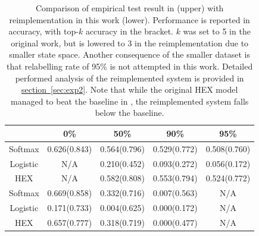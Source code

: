 \documentclass[11pt,a4paper]{article}
\begin{document}
\begin{table}[htbp]
\centering
\begin{tabular}{c|c|c|c|c}
 & 0\% & 50\% & 90\% & 95\%\\
\hline
Softmax & 0.626(0.843) & 0.564(0.796) & 0.529(0.772) & 0.508(0.760)\\
Logistic & N/A & 0.210(0.452) & 0.093(0.272) & 0.056(0.172)\\
HEX & N/A & 0.582(0.808) & 0.553(0.794) & 0.524(0.772)\\
\hline
Softmax & 0.669(0.858) & 0.332(0.716) & 0.007(0.563) & N/A\\
Logistic & 0.171(0.733) & 0.004(0.625) & 0.000(0.172) & N/A\\
HEX & 0.657(0.777) & 0.318(0.719) & 0.000(0.477) & N/A
\end{tabular}
\caption{Comparison of empirical test result in \cite{deng2014large} (upper) with reimplementation in this work (lower). Performance is reported in accuracy, with top-$k$ accuracy in the bracket. $k$ was set to 5 in the original work, but is lowered to 3 in the reimplementation due to smaller state space. Another consequence of the smaller dataset is that relabelling rate of 95\% is not attempted in this work. Detailed performed analysis of the reimplemented system is provided in \hyperref[sec:exp2]{section~\ref{sec:exp2}}. Note that while the original HEX model managed to beat the baseline in \cite{deng2014large}, the reimplemented system falls below the baseline.}
\end{table}
\end{document}
